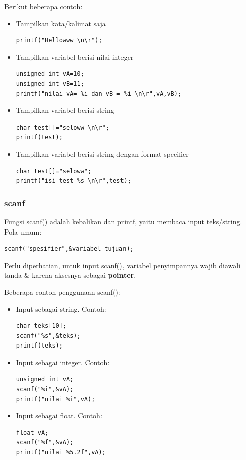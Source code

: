 \documentclass[12pt,]{article}
\begin{document}
	Berikut beberapa contoh:
	\begin{itemize}
		\item Tampilkan kata/kalimat saja
		\begin{verbatim}
printf("Hellowww \n\r");
		\end{verbatim}
		
		\item Tampilkan variabel berisi nilai integer
		\begin{verbatim}
unsigned int vA=10;
unsigned int vB=11;
printf("nilai vA= %i dan vB = %i \n\r",vA,vB);
		\end{verbatim}
		
		\item Tampilkan variabel berisi string
		\begin{verbatim}
char test[]="seloww \n\r";
printf(test);
		\end{verbatim}
		
		\item Tampilkan variabel berisi string dengan format specifier
		\begin{verbatim}
char test[]="seloww";
printf("isi test %s \n\r",test);
		\end{verbatim}
	\end{itemize}

	\subsubsection{scanf}
	
	Fungsi scanf() adalah kebalikan dan printf, yaitu membaca input teks/string.
	Pola umum:
	\begin{verbatim}
scanf("spesifier",&variabel_tujuan);
	\end{verbatim}
	Perlu diperhatian, untuk input scanf(), variabel penyimpannya wajib diawali tanda \& karena aksesnya sebagai \textbf{pointer}.
	
	Beberapa contoh penggunaan scanf():
	\begin{itemize}
		\item Input sebagai string.
		Contoh:
		\begin{verbatim}
char teks[10];
scanf("%s",&teks);
printf(teks);
		\end{verbatim}
		
		\item Input sebagai integer.
		Contoh:
		\begin{verbatim}
unsigned int vA;
scanf("%i",&vA);
printf("nilai %i",vA);
		\end{verbatim}
		
		\item Input sebagai float.
		Contoh:
		\begin{verbatim}
float vA;
scanf("%f",&vA);
printf("nilai %5.2f",vA);
		\end{verbatim}
		
	\end{itemize}
	
\end{document}
